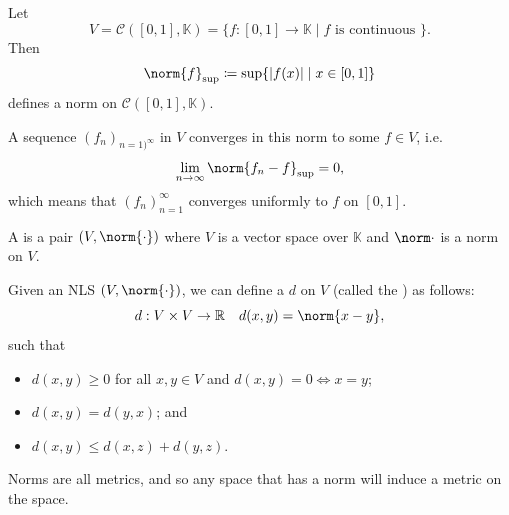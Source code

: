 \documentclass[notoc,notitlepage]{tufte-book}
\begin{document}
\begin{eg}
  Let
  \begin{equation*}
    V = \mathcal{C}([0, 1], \mathbb{K}) = \{ f : [0, 1] \to \mathbb{K} \mid f
    \text{ is continuous } \}.
  \end{equation*}
  Then
  \begin{equation*}
    \norm{f}_{\sup} \coloneqq \sup \{ \abs{f(x)} \mid x \in [0, 1] \}
  \end{equation*}
   defines a norm on $\mathcal{C}([0, 1], \mathbb{K})$.

  A sequence $(f_n)_{n=1)^{\infty}}$ in $V$ converges in this norm to some $f
  \in V$, i.e.
  \begin{equation*}
    \lim_{n \to \infty} \norm{f_n - f}_{\sup} = 0,
  \end{equation*}
  which means that $(f_n)_{n=1}^{\infty}$ converges uniformly to $f$ on $[0,
  1]$.
\end{eg}

\begin{defn}\label{defn:normed_linear_space}
  A  is a pair $(V, \norm{\cdot})$ where $V$
  is a vector space over $\mathbb{K}$ and $\norm\cdot$ is a norm on $V$.
\end{defn}

\begin{defn}[Metric]\label{defn:metric}
  Given an NLS $(V, \norm{\cdot})$, we can define a  $d$ on $V$ (called the
  ) as follows:
  \begin{equation*}
    d : V \times V \to \mathbb{R} \quad d(x, y) = \norm{x - y},
  \end{equation*}
  such that
  \begin{itemize}
    \item $d(x, y) \geq 0$ for all $x, y \in V$ and $d(x, y) = 0 \iff x = y$;
    \item $d(x, y) = d(y, x)$; and
    \item $d(x, y) \leq d(x, z) + d(y, z)$.
  \end{itemize}
\end{defn}

\begin{note}
  Norms are all metrics, and so any space that has a norm will induce a metric
  on the space.
\end{note}
\end{document}
